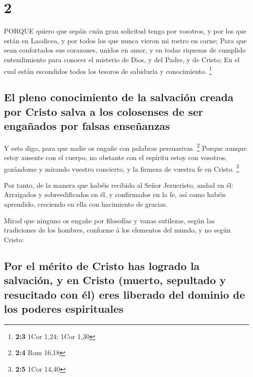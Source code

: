 \hypertarget{section-1}{%
\section{2}\label{section-1}}

 PORQUE quiero que sepáis cuán gran solicitud tengo por
vosotros, y por los que están en Laodicea, y por todos los que nunca
vieron mi rostro en carne;  Para que sean confortados sus
corazones, unidos en amor, y en todas riquezas de cumplido entendimiento
para conocer el misterio de Dios, y del Padre, y de Cristo; 
En el cual están escondidos todos los tesoros de sabiduría y
conocimiento. \footnote{\textbf{2:3} 1Cor 1,24; 1Cor 1,30}

\hypertarget{el-pleno-conocimiento-de-la-salvaciuxf3n-creada-por-cristo-salva-a-los-colosenses-de-ser-engauxf1ados-por-falsas-enseuxf1anzas}{%
\subsection{El pleno conocimiento de la salvación creada por Cristo
salva a los colosenses de ser engañados por falsas
enseñanzas}\label{el-pleno-conocimiento-de-la-salvaciuxf3n-creada-por-cristo-salva-a-los-colosenses-de-ser-engauxf1ados-por-falsas-enseuxf1anzas}}

 Y esto digo, para que nadie os engañe con palabras
persuasivas. \footnote{\textbf{2:4} Rom 16,18}  Porque
aunque estoy ausente con el cuerpo, no obstante con el espíritu estoy
con vosotros, gozándome y mirando vuestro concierto, y la firmeza de
vuestra fe en Cristo. \footnote{\textbf{2:5} 1Cor 14,40}

 Por tanto, de la manera que habéis recibido al Señor
Jesucristo, andad en él:  Arraigados y sobreedificados en
él, y confirmados en la fe, así como habéis aprendido, creciendo en ella
con hacimiento de gracias.

 Mirad que ninguno os engañe por filosofías y vanas
sutilezas, según las tradiciones de los hombres, conforme á los
elementos del mundo, y no según Cristo:

\hypertarget{por-el-muxe9rito-de-cristo-has-logrado-la-salvaciuxf3n-y-en-cristo-muerto-sepultado-y-resucitado-con-uxe9l-eres-liberado-del-dominio-de-los-poderes-espirituales}{%
\subsection{Por el mérito de Cristo has logrado la salvación, y en
Cristo (muerto, sepultado y resucitado con él) eres liberado del dominio
de los poderes
espirituales}\label{por-el-muxe9rito-de-cristo-has-logrado-la-salvaciuxf3n-y-en-cristo-muerto-sepultado-y-resucitado-con-uxe9l-eres-liberado-del-dominio-de-los-poderes-espirituales}}

